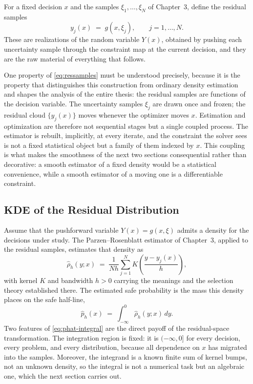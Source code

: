 For a fixed decision $x$ and the samples $\xi_1,\dots,\xi_N$ of
Chapter~3, define the residual samples
\begin{equation}
  y_j(x) \;=\; g(x,\xi_j), \qquad j = 1,\dots,N .
  \label{eq:ressamples}
\end{equation}
These are realizations of the random variable $Y(x)$, obtained by
pushing each uncertainty sample through the constraint map at the
current decision, and they are the raw material of everything that
follows.

One property of \cref{eq:ressamples} must be understood precisely,
because it is the property that distinguishes this construction from
ordinary density estimation and shapes the analysis of the entire
thesis: the residual samples are functions of the decision variable.
The uncertainty samples $\xi_j$ are drawn once and frozen; the residual
cloud $\{y_j(x)\}$ moves whenever the optimizer moves $x$. Estimation
and optimization are therefore not sequential stages but a single
coupled process. The estimator is rebuilt, implicitly, at every iterate,
and the constraint the solver sees is not a fixed statistical object but
a family of them indexed by $x$. This coupling is what makes the
smoothness of the next two sections consequential rather than
decorative: a smooth estimator of a fixed density would be a statistical
convenience, while a smooth estimator of a moving one is a differentiable
constraint.

\subsection{KDE of the Residual Distribution}
\label{sec:residualkde}

Assume that the pushforward variable $Y(x)=g(x,\xi)$ admits a density for the decisions under study. The Parzen--Rosenblatt estimator of Chapter~3, applied to the residual samples, estimates that density as
\begin{equation}
  \hat{\rho}_h(y;x)
  \;=\; \frac{1}{Nh}\sum_{j=1}^{N}
  K\!\left(\frac{y - y_j(x)}{h}\right),
  \label{eq:reskde}
\end{equation}
with kernel $K$ and bandwidth $h > 0$ carrying the meanings and the
selection theory established there. The estimated safe probability is the mass this density places on the safe
half-line,
\begin{equation}
  \hat{p}_h(x)
  \;=\; \int_{-\infty}^{0} \hat{\rho}_h(y;x)\, dy .
  \label{eq:phat-integral}
\end{equation}
Two features of \cref{eq:phat-integral} are the
direct payoff of the residual-space transformation. The integration
region is fixed: it is $(-\infty, 0]$ for every decision, every problem,
and every distribution, because all dependence on $x$ has migrated into
the samples. Moreover, the integrand is a known finite sum of kernel bumps,
not an unknown density, so the integral is not a numerical task but an
algebraic one, which the next section carries out.


